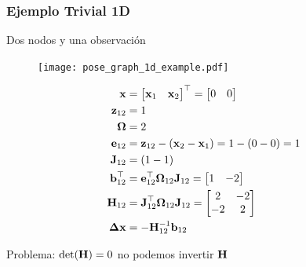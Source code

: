 \begin{frame}
	\frametitle{Ejemplo Trivial 1D}
	
    Dos nodos y una observación

 	\begin{figure}[!h]
        \texttt{[image: pose\_graph\_1d\_example.pdf]}
    \end{figure}

    \small

    \begin{align*}
        \boldsymbol{\mathbf{x}} &=
        \begin{bmatrix}
            \boldsymbol{\mathbf{x}}_{1} & \boldsymbol{\mathbf{x}}_{2}
        \end{bmatrix}^{\top}
        =
        \begin{bmatrix}
            0 & 0
        \end{bmatrix}\\
        \boldsymbol{\mathbf{z}}_{12} &= 1\\
        \boldsymbol{\mathbf{\Omega}} &= 2\\
        \boldsymbol{\mathbf{e}}_{12} &= \boldsymbol{\mathbf{z}}_{12} - (\boldsymbol{\mathbf{x}}_{2} - \boldsymbol{\mathbf{x}}_{1}) = 1 - (0 - 0) = 1\\
        \boldsymbol{\mathbf{J}}_{12} &= (1 - 1)\\
        \boldsymbol{\mathbf{b}}_{12}^{\top} &= \boldsymbol{\mathbf{e}}_{12}^{\top} \boldsymbol{\mathbf{\Omega}}_{12} \boldsymbol{\mathbf{J}}_{12} =
        \begin{bmatrix}
            1 & -2
        \end{bmatrix}\\
        \boldsymbol{\mathbf{H}}_{12} &= \boldsymbol{\mathbf{J}}_{12}^{\top} \boldsymbol{\mathbf{\Omega}}_{12} \boldsymbol{\mathbf{J}}_{12} = 
        \begin{bmatrix}
            2 & -2\\
            -2 & 2
        \end{bmatrix}\\
    \boldsymbol{\mathbf{\Delta}}\boldsymbol{\mathbf{x}} &= -{\boldsymbol{\mathbf{H}}}^{-1}_{12} \boldsymbol{\mathbf{b}}_{12}\\
    \end{align*}

    \begin{center}
    \alert{Problema:} $\det(\boldsymbol{\mathbf{H}}) = 0$ no podemos invertir $\boldsymbol{\mathbf{H}}$
    \end{center}
\end{frame}

